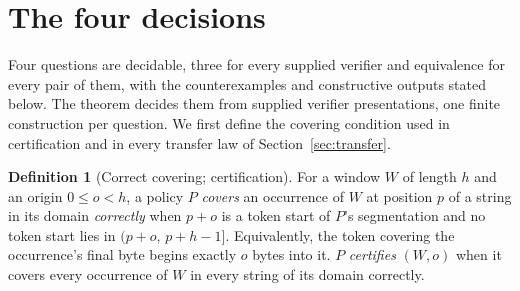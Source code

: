 \documentclass[11pt,a4paper]{article}
\theoremstyle{definition}
\newtheorem{definition}{Definition}
\theoremstyle{plain}
\begin{document}
\section{The four decisions}\label{sec:four}


Four questions are decidable, three for every supplied verifier and equivalence for every pair of them, with the
counterexamples and constructive outputs stated below. The theorem decides them from supplied verifier presentations,
one finite construction per question. We first define the covering condition used in certification and in every transfer
law of Section~\ref{sec:transfer}.

\begin{definition}[Correct covering; certification]\label{def:cover} For a window $W$ of length $h$ and an origin
$0 \le o < h$, a policy $P$ \emph{covers} an occurrence of $W$ at position $p$ of a string in its domain
\emph{correctly} when $p+o$ is a token start of $P$'s segmentation and no token start lies in $(p+o,\,p+h-1]$.
Equivalently, the token covering the occurrence's final byte begins exactly $o$ bytes into it. $P$ \emph{certifies}
$(W,o)$ when it covers every occurrence of $W$ in every string of its domain correctly.
\end{definition}
\end{document}
